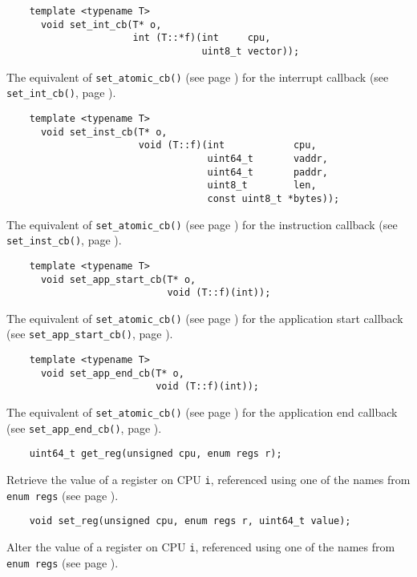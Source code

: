 \documentclass[letterpaper, 10pt]{book}
\begin{document}
\label{tf:set_int_cb} \begin{verbatim}
    template <typename T>
      void set_int_cb(T* o,
                      int (T::*f)(int     cpu, 
                                  uint8_t vector));
\end{verbatim}
The equivalent of \texttt{set\_atomic\_cb()} (see page
\pageref{tf:set_atomic_cb}) for the interrupt callback (see 
\texttt{set\_int\_cb()}, page \pageref{func:set_int_cb}).

\label{tf:set_inst_cb} \begin{verbatim}
    template <typename T>
      void set_inst_cb(T* o,
                       void (T::f)(int            cpu,
                                   uint64_t       vaddr,
                                   uint64_t       paddr,
                                   uint8_t        len,
                                   const uint8_t *bytes));
\end{verbatim}
The equivalent of \texttt{set\_atomic\_cb()} (see page
\pageref{tf:set_atomic_cb}) for the instruction callback (see 
\texttt{set\_inst\_cb()}, page \pageref{func:set_inst_cb}).

\label{tf:set_app_start_cb} \begin{verbatim}
    template <typename T>
      void set_app_start_cb(T* o,
                            void (T::f)(int));
\end{verbatim}
The equivalent of \texttt{set\_atomic\_cb()} (see page
\pageref{tf:set_atomic_cb}) for the application start callback (see
\texttt{set\_app\_start\_cb()}, page \pageref{func:set_app_start_cb}).

\label{tf:set_app_end_cb} \begin{verbatim}
    template <typename T>
      void set_app_end_cb(T* o,
                          void (T::f)(int));
\end{verbatim}
The equivalent of \texttt{set\_atomic\_cb()} (see page 
\pageref{tf:set_atomic_cb}) for the application end callback (see 
\texttt{set\_app\_end\_cb()}, page \pageref{func:set_app_end_cb}).

\label{func:get_reg} \begin{verbatim}
    uint64_t get_reg(unsigned cpu, enum regs r);
\end{verbatim}
Retrieve the value of a register on CPU \texttt{i}, referenced using one of the
names from \texttt{enum regs} (see page \pageref{enum:regs}).

\label{func:set_reg} \begin{verbatim}
    void set_reg(unsigned cpu, enum regs r, uint64_t value);
\end{verbatim}
Alter the value of a register on CPU \texttt{i}, referenced using one of the
names from \texttt{enum regs} (see page \pageref{enum:regs}).
\end{document}
